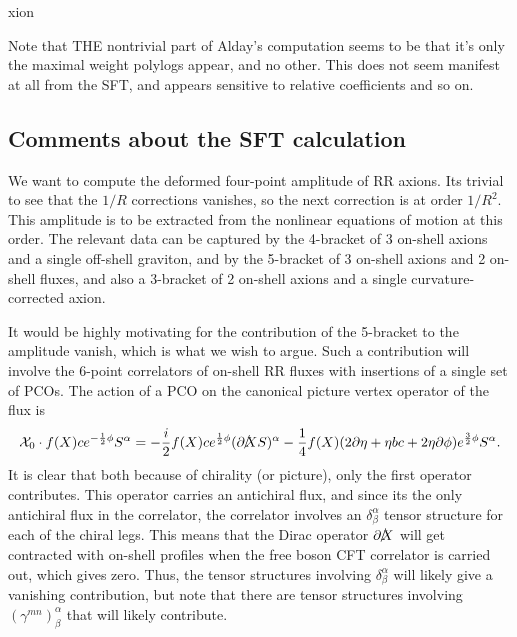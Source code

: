 xion\documentclass[12pt]{article}
\def\be{\begin{equation}}
\def\ee{\end{equation}}
\numberwithin{equation}{section}
\begin{document}
Note that THE nontrivial part of Alday's computation seems to be that it's only the maximal weight polylogs appear, and no other. This does not seem manifest at all from the SFT, and appears sensitive to relative coefficients and so on.


\subsection{Comments about the SFT calculation}

We want to compute the deformed four-point amplitude of RR axions. Its trivial to see that the $1/R$ corrections vanishes, so the next correction is at order $1/R^2$. This amplitude is to be extracted from the nonlinear equations of motion at this order. The relevant data can be captured by the 4-bracket of 3 on-shell axions and a single off-shell graviton, and by the 5-bracket of 3 on-shell axions and 2 on-shell fluxes, and also a 3-bracket of 2 on-shell axions and a single curvature-corrected axion.

It would be highly motivating for the contribution of the 5-bracket to the amplitude vanish, which is what we wish to argue. Such a contribution will involve the 6-point correlators of on-shell RR fluxes with insertions of a single set of PCOs. The action of a PCO on the canonical picture vertex operator of the flux is
\be
{\cal X}_0 \cdot f(X) ce^{-\frac12\phi}S^\alpha =  -\frac{i}{2} f(X) ce^{\frac12\phi} (\slashed{\partial X} S)^\alpha - \frac{1}{4}f(X)(2 \partial \eta + \eta bc + 2 \eta \partial \phi)e^{\frac32\phi}S^\alpha.
\ee
It is clear that both because of chirality (or picture), only the first operator contributes. This operator carries an antichiral flux, and since its the only antichiral flux in the correlator, the correlator involves an $\delta^\alpha_\beta$ tensor structure for each of the chiral legs. This means that the Dirac operator $\slashed{\partial X}$ will get contracted with on-shell profiles when the free boson CFT correlator is carried out, which gives zero. Thus, the tensor structures involving $\delta^\alpha_\beta$ will likely give a vanishing contribution, but note that there are tensor structures involving $(\gamma^{mn})^\alpha_\beta$ that will likely contribute.
\end{document}
